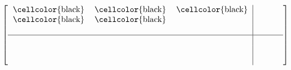 \documentclass{article}
\begin{document}
\begin{equation}
\left[
\begin{tabular}{ccc|ccc}
  \cellcolor{black} &\cellcolor{black}&\cellcolor{black}&&& \\
  \cellcolor{black}  &\cellcolor{black}&&&& \\
    &&&&& \\ \hline
    &&&&& \\
    &&&&& \\
    &&&&& \\
\end{tabular}
\right]
\end{equation}
\end{document}
